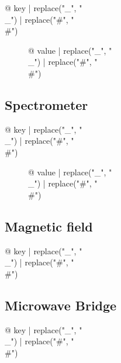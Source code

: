 \begin{multicols}{2}
\begin{description}
\item[{@ key | replace("_", "\\_") | replace("#", "\\#") }] {@ value | replace("_", "\\_") | replace("#", "\\#") }
\end{description}

\subsection{Spectrometer}

\begin{description}
\item[{@ key | replace("_", "\\_") | replace("#", "\\#") }] {@ value | replace("_", "\\_") | replace("#", "\\#") }
\end{description}

\subsection{Magnetic field}

\begin{description}
\item[{@ key | replace("_", "\\_") | replace("#", "\\#") }] %
\end{description}

\subsection{Microwave Bridge}

\begin{description}
\item[{@ key | replace("_", "\\_") | replace("#", "\\#") }] %
\end{description}


\end{multicols}
